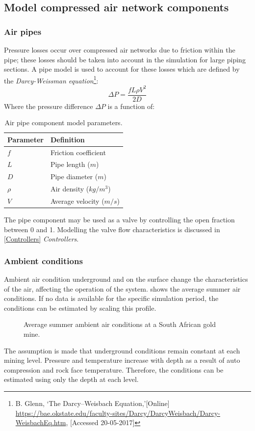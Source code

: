 	\subsection{Model compressed air network components}
		\subsubsection{Air pipes}
		Pressure losses occur over compressed air networks due to friction within the pipe; these losses should be taken into account in the simulation for large piping sections. A pipe model is used to account for these losses which are defined by the \textit{Darcy-Weissman equation}\footnote{ B. Glenn, \enquote*{The Darcy–Weisbach Equation,}[Online] \url{https://bae.okstate.edu/faculty-sites/Darcy/DarcyWeisbach/Darcy-WeisbachEq.htm}, [Accessed 20-05-2017]}:
		$$\Delta P = \frac{f L \rho V^2}{2 D}$$
		Where the pressure difference $\Delta P $ is a function of:
		\begin{table}[h]
			\centering
			\begin{tabular}{ll}
				\hline
				Parameter & Definition\\
				\hline
				$f$ & Friction coefficient \\
				$L$ & Pipe length ($m$) \\
				$D$ & Pipe diameter ($m$) \\
				$\rho$ & Air density ($kg/m^3$)\\	
				$V$ & Average velocity ($m/s$) \\	
				\hline
			\end{tabular} 
		\caption{Air pipe component model parameters.}
		\label{table: Darcy-Weisbach}
		\end{table}
		
		The pipe component may be used as a valve by controlling the open fraction between 0 and 1. Modelling the valve flow characteristics is discussed in \cref{Controllers} \textit{Controllers}.
		\subsubsection{Ambient conditions}
		Ambient air condition underground and on the surface change the characteristics of the air, affecting the operation of the system.  shows the average summer air conditions. If no data is available for the specific simulation period, the conditions can be estimated by scaling this profile.
		\begin{figure}[h]
			\centering
			\fbox{}
			\caption{Average summer ambient air conditions at a South African gold mine.}
			\label{fig: Ambient}
		\end{figure}
		The assumption is made that underground conditions remain constant at each mining level. Pressure and temperature increase with depth as a result of auto compression and rock face temperature. Therefore, the conditions can be estimated using only the depth at each level.
